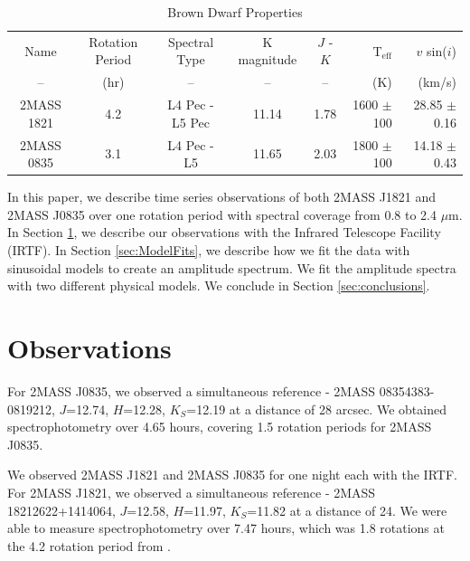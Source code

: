 \documentclass[twocolumn]{aastex6}
\begin{document}
\begin{table}
\begin{center}
\caption{Brown Dwarf Properties}\label{tab:bdProp}
\begin{tabular}{cccccrr}
Name & Rotation Period & Spectral Type & K magnitude  & $J$ - $K$ & T$_\mathrm{eff}$ &  $v$ sin($i$) \\
-- & (hr) & -- & -- & -- & (K) & (km/s) \\
\hline \hline
2MASS 1821 & 4.2\tablenotemark{a} & L4 Pec\tablenotemark{b} - L5 Pec\tablenotemark{c} & 11.14 & 1.78 & 1600 $\pm$ 100\tablenotemark{b} & 28.85 $\pm$ 0.16\tablenotemark{d}\\
2MASS 0835 & 3.1\tablenotemark{e} & L4 Pec\tablenotemark{b} - L5\tablenotemark{f} & 11.65 & 2.03 & 1800 $\pm$ 100\tablenotemark{b} & 14.18 $\pm$ 0.43\tablenotemark{d} \\
\end{tabular}
\end{center}
\end{table}

In this paper, we describe time series observations of both 2MASS J1821 and 2MASS J0835 over one rotation period with spectral coverage from 0.8 to 2.4 $\mu$m.
In Section \ref{sec:obs}, we describe our observations with the Infrared Telescope Facility (IRTF).
In Section \ref{sec:ModelFits}, we describe how we fit the data with sinusoidal models to create an amplitude spectrum.
We fit the amplitude spectra with two different physical models.
We conclude in Section \ref{sec:conclusions}.


\section{Observations}\label{sec:obs}

For 2MASS J0835, we observed a simultaneous reference - 2MASS 08354383-0819212, $J$=12.74, $H$=12.28, $K_S$=12.19 at a distance of 28 arcsec.
We obtained spectrophotometry over 4.65 hours, covering 1.5 rotation periods for 2MASS J0835.

We observed 2MASS J1821 and 2MASS J0835 for one night each with the IRTF.
For 2MASS J1821, we observed a simultaneous reference - 2MASS 18212622+1414064, $J$=12.58, $H$=11.97, $K_S$=11.82  at a distance of 24\arcsec.
We were able to measure spectrophotometry over 7.47 hours, which was 1.8 rotations at the 4.2 rotation period from \citet{metchev2015weatherII}.
\end{document}
